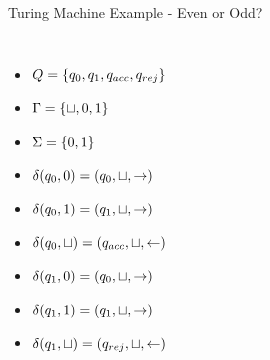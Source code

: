 \documentclass[c]{beamer}
\begin{document}

\begin{frame}{Turing Machine Example - Even or Odd?}
  \begin{columns}[c]
    
    \small


    \begin{itemize}
    \item[] $Q = \{q_0, q_1, q_{acc}, q_{rej}\}$
    \item[] $\Gamma = \{\sqcup, 0, 1\}$
    \item[] $\Sigma = \{0,1\}$
    \item[] $\delta(q_0, 0) = (q_0, \sqcup, \rightarrow)$
    \item[] $\delta(q_0, 1) = (q_1, \sqcup, \rightarrow)$
    \item[] $\delta(q_0, \sqcup) = (q_{acc}, \sqcup, \leftarrow)$
    \item[] $\delta(q_1, 0) = (q_0, \sqcup, \rightarrow)$
    \item[] $\delta(q_1, 1) = (q_1, \sqcup, \rightarrow)$
    \item[] $\delta(q_1, \sqcup) = (q_{rej}, \sqcup, \leftarrow)$
    \end{itemize}

    
      
  \end{columns}
\end{frame}

    
\end{document}
